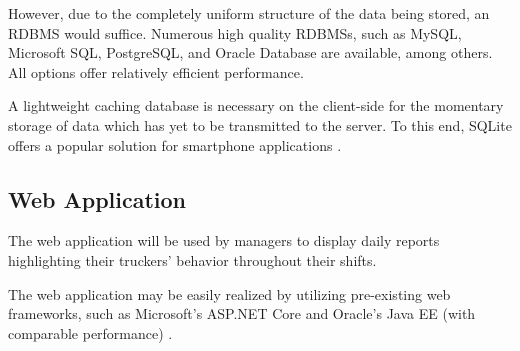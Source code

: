 However, due to the completely uniform structure of the data being stored, an RDBMS would suffice.
Numerous high quality RDBMSs, such as MySQL, Microsoft SQL, PostgreSQL, and Oracle Database are available, among others. All options offer relatively efficient performance.
\cite{truskowski2020comparison}

A lightweight caching database is necessary on the client-side for the momentary storage of data which has yet to be transmitted to the server. To this end, SQLite offers a popular solution for smartphone applications \cite{bhosale2015sqlite}.

\subsection{Web Application}
The web application will be used by managers to display daily reports highlighting their truckers' behavior throughout their shifts.

The web application may be easily realized by utilizing pre-existing web frameworks, such as Microsoft's ASP.NET Core and Oracle's Java EE (with comparable performance) \cite{kronis2018performance}.

